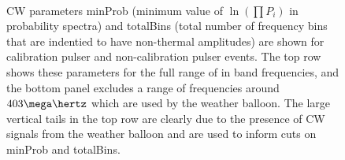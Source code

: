 \begin{figure}[htpb]
  \hfill
  \\
  \hfill
  \caption{CW parameters minProb (minimum value of $\ln(\prod P_{i})$ in probability spectra) and totalBins (total number of frequency bins that are indentied to have non-thermal amplitudes) are shown for calibration pulser and non-calibration pulser events. The top row shows these parameters for the full range of in band frequencies, and the bottom panel excludes a range of frequencies around $403 \mega \hertz$ which are used by the weather balloon. The large vertical tails in the top row are clearly due to the presence of CW signals from the weather balloon and are used to inform cuts on minProb and totalBins.}
  \label{fig:analysis:CWRemoval:Filtering:CW-MinProb-TotalBins}
\end{figure}





















